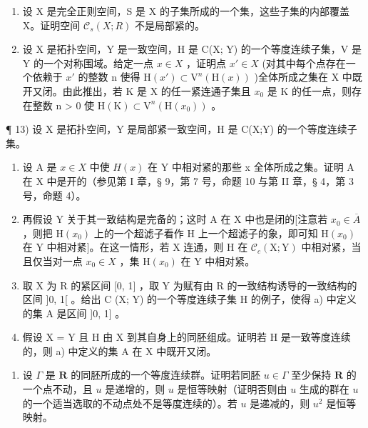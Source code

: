 \begin{enumerate}
\def\labelenumi{\arabic{enumi})}
\setcounter{enumi}{10}
\item
  设 X 是完全正则空间，S 是 X 的子集所成的一个集，这些子集的内部覆盖 X。证明空间 \(\mathcal{C}_{s}(X;R)\) 不是局部紧的。
\item
  设 X 是拓扑空间，Y 是一致空间，H 是 C(X; Y) 的一个等度连续子集，V 是 Y 的一个对称围域。给定一点 \(x \in X\) ，证明点 \(x' \in X\) (对其中每个点存在一个依赖于 \(x'\) 的整数 n 使得 \(\mathrm{H}(x') \subset \mathrm{V}^n(\mathrm{H}(x))\) )全体所成之集在 X 中既开又闭。由此推出，若 K 是 X 的任一紧连通子集且 \(x_0\) 是 K 的任一点，则存在整数 n \textgreater{} 0 使 \(\mathrm{H}(\mathrm{K}) \subset \mathrm{V}^n(\mathrm{H}(x_0))\) 。
\end{enumerate}

¶ 13) 设 X 是拓扑空间，Y 是局部紧一致空间，H 是 C(X;Y) 的一个等度连续子集。

\begin{enumerate}
\def\labelenumi{\alph{enumi})}
\item
  设 A 是 \(x \in X\) 中使 \(H(x)\) 在 Y 中相对紧的那些 x 全体所成之集。证明 A 在 X 中是开的（参见第 I 章，§ 9，第 7 号，命题 10 与第 II 章，§ 4，第 3 号，命题 4）。
\item
  再假设 Y 关于其一致结构是完备的；这时 A 在 X 中也是闭的{[}注意若 \(x_{0} \in \overline{A}\) ，则把 \(\mathrm{H}(x_{0})\) 上的一个超滤子看作 H 上一个超滤子的象，即可知 \(\mathrm{H}(x_{0})\) 在 Y 中相对紧{]}。在这一情形，若 X 连通，则 H 在 \(\mathcal{C}_{c}(\mathrm{X};\mathrm{Y})\) 中相对紧，当且仅当对一点 \(x_{0} \in X\) ，集 \(\mathrm{H}(x_{0})\) 在 Y 中相对紧。
\item
  取 X 为 R 的紧区间 {[}0, 1{]} ，取 Y 为赋有由 R 的一致结构诱导的一致结构的区间 {]}0, 1{[} 。给出 C (X; Y) 的一个等度连续子集 H 的例子，使得 a) 中定义的集 A 是区间 {]}0, 1{]} 。
\item
  假设 X = Y 且 H 由 X 到其自身上的同胚组成。证明若 H 是一致等度连续的，则 a) 中定义的集 A 在 X 中既开又闭。
\end{enumerate}

\begin{enumerate}
\def\labelenumi{\arabic{enumi})}
\setcounter{enumi}{13}
\tightlist
\item
  设 \(\Gamma\) 是 \(\mathbf{R}\) 的同胚所成的一个等度连续群。证明若同胚 \(u \in \Gamma\) 至少保持 \(\mathbf{R}\) 的一个点不动，且 \(u\) 是递增的，则 \(u\) 是恒等映射（证明否则由 \(u\) 生成的群在 \(u\) 的一个适当选取的不动点处不是等度连续的）。若 \(u\) 是递减的，则 \(u^2\) 是恒等映射。
\end{enumerate}

